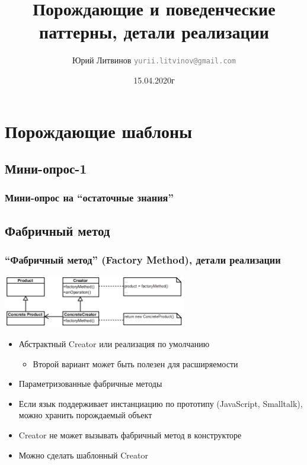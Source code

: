 \documentclass[xetex,mathserif,serif]{beamer}
\title{Порождающие и поведенческие паттерны, детали реализации}
\author[Юрий Литвинов]{Юрий Литвинов \newline \textcolor{gray}{\small\texttt{yurii.litvinov@gmail.com}}}
\date{15.04.2020г}
\begin{document}
    
    \frame{\titlepage}

    \section{Порождающие шаблоны}

    \subsection{Мини-опрос-1}

    \begin{frame}
        \frametitle{Мини-опрос на ``остаточные знания''}
    \end{frame}

    \subsection{Фабричный метод}

    \begin{frame}
        \frametitle{``Фабричный метод'' (Factory Method), детали реализации}
        \begin{center}
            \includegraphics[width=0.6\textwidth]{factoryMethod.png}
        \end{center}
        \begin{itemize}
            \item Абстрактный Creator или реализация по умолчанию
            \begin{itemize}
                \item Второй вариант может быть полезен для расширяемости
            \end{itemize}
            \item Параметризованные фабричные методы
            \item Если язык поддерживает инстанциацию по прототипу (JavaScript, Smalltalk), можно хранить порождаемый объект
            \item Creator не может вызывать фабричный метод в конструкторе
            \item Можно сделать шаблонный Creator
        \end{itemize}
    \end{frame}
\end{document}
